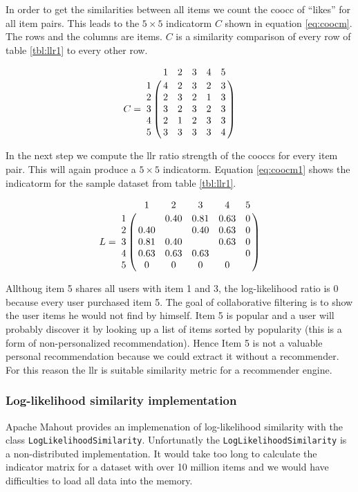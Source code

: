 In order to get the similarities between all items we count the \gls{coocc} of ``\glspl{like}'' for all item pairs. This leads to the $5 \times 5$ \gls{indicatorm} $C$ shown in equation \ref{eq:coocm}. The rows and the columns are items. $C$ is a similarity comparison of every row of table \ref{tbl:llr1} to every other row.

\begin{equation}
  \label{eq:coocm}
C =\bordermatrix{~ & 1 & 2 & 3 & 4 & 5 \cr
1 & 4 & 2 & 3 & 2 & 3 \cr
2 & 2 & 3 & 2 & 1 & 3 \cr
3 & 3 & 2 & 3 & 2 & 3 \cr
4 & 2 & 1 & 2 & 3 & 3 \cr
5 & 3 & 3 & 3 & 3 & 4 \cr}
\end{equation}

In the next step we compute the \gls{llr} ratio strength of the \glspl{coocc} for every item pair. This will again produce a $5 \times 5$ \gls{indicatorm}. Equation \ref{eq:coocm1} shows the \gls{indicatorm} for the sample dataset from table \ref{tbl:llr1}.

\begin{equation}
  \label{eq:coocm1}
L =\bordermatrix{~ & 1 & 2 & 3 & 4 & 5 \cr
1 &   & 0.40 & 0.81 & 0.63 & 0 \cr
2 & 0.40 &  & 0.40 & 0.63 & 0 \cr
3 & 0.81 & 0.40 &  & 0.63 & 0 \cr
4 & 0.63 & 0.63 & 0.63 &  & 0 \cr
5 & 0 & 0 & 0 & 0 & \cr
}
\end{equation}

Allthoug item 5 shares all users with item 1 and 3, the log-likelihood ratio is 0 because every user purchased item 5. The goal of collaborative filtering is to show the user items he would not find by himself. Item 5 is popular and a user will probably discover it by looking up a list of items sorted by popularity (this is a form of non-personalized recommendation). Hence Item 5 is not a valuable personal recommendation because we could extract it without a recommender. For this reason the \gls{llr} is suitable similarity metric for a recommender engine.

\subsubsection{Log-likelihood similarity implementation}
\label{sec:llrimpl}

Apache Mahout provides an implemenation of log-likelihood similarity with the class \verb|LogLikelihoodSimilarity|. Unfortunatly the \verb|LogLikelihoodSimilarity| is a non-distributed implementation. It would take too long to calculate the indicator matrix for a dataset with over 10 million items and we would have difficulties to load all data into the memory. 


